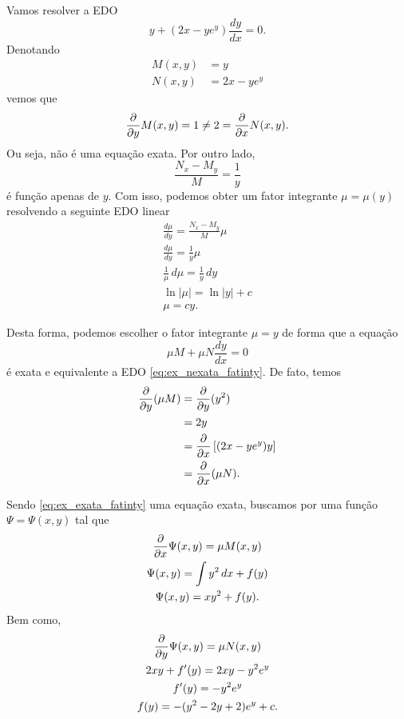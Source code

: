 \begin{ex}
  Vamos resolver a EDO
  \begin{equation}\label{eq:ex_nexata_fatinty}
    y + (2x - ye^y)\frac{dy}{dx} = 0.
  \end{equation}
  Denotando
  \begin{align}
    M(x,y) &= y \\
    N(x,y) &= 2x - ye^y
  \end{align}
  vemos que
  \begin{equation}
    \frac{\partial}{\partial y}M(x,y) = 1 \neq 2 = \frac{\partial}{\partial x}N(x,y).
  \end{equation}
  Ou seja, não é uma equação exata. Por outro lado,
  \begin{equation}
    \frac{N_x-M_y}{M} = \frac{1}{y}
  \end{equation}
  é função apenas de $y$. Com isso, podemos obter um fator integrante $\mu = \mu(y)$ resolvendo a seguinte EDO linear
  \begin{gather}
    \frac{d\mu}{dy} = \frac{N_x-M_y}{M}\mu \\
    \frac{d\mu}{dy} = \frac{1}{y}\mu \\
    \frac{1}{\mu}\,d\mu = \frac{1}{y}\,dy \\
    \ln|\mu| = \ln|y| + c \\
    \mu = cy.
  \end{gather}

  Desta forma, podemos escolher o fator integrante $\mu = y$ de forma que a equação
  \begin{equation}\label{eq:ex_exata_fatinty}
    \mu M + \mu N\frac{dy}{dx} = 0
  \end{equation}
  é exata e equivalente a EDO \eqref{eq:ex_nexata_fatinty}. De fato, temos
  \begin{align}
    \frac{\partial}{\partial y}(\mu M) &= \frac{\partial}{\partial y}(y^2) \\
    &= 2y \\
    &= \frac{\partial}{\partial x}\left[(2x-ye^y)y\right] \\
    &= \frac{\partial}{\partial x}(\mu N).
  \end{align}
  
  Sendo \eqref{eq:ex_exata_fatinty} uma equação exata, buscamos por uma função $\Psi = \Psi(x,y)$ tal que
  \begin{gather}
    \frac{\partial}{\partial x}\Psi(x,y) = \mu M(x,y) \\
    \Psi(x,y) = \int y^2\,dx + f(y) \\
    \Psi(x,y) = xy^2 + f(y).
  \end{gather}
  Bem como,
  \begin{gather}
    \frac{\partial}{\partial y}\Psi(x,y) = \mu N(x,y) \\
    2xy + f'(y) = 2xy - y^2e^{y} \\
    f'(y) = -y^2e^{y} \\
    f(y) = -(y^2-2y+2)e^y + c.
  \end{gather}


\end{ex}
